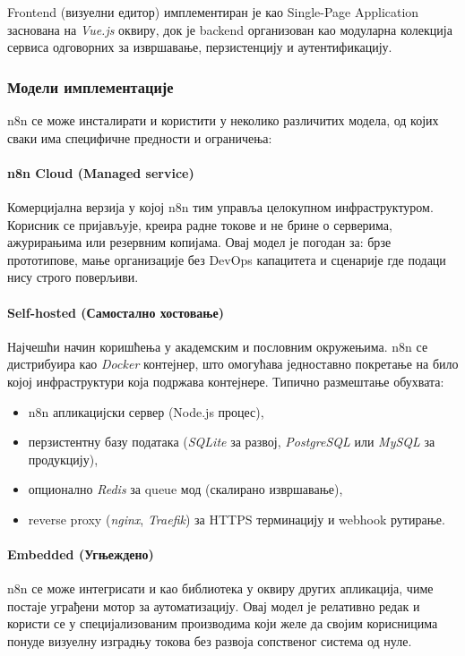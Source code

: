 Frontend (визуелни едитор) имплементиран је као Single-Page Application
заснована на \textit{Vue.js} оквиру, док је backend организован као
модуларна колекција сервиса одговорних за извршавање, перзистенцију
и аутентификацију.

\subsubsection{Модели имплементације}

n8n се може инсталирати и користити у неколико различитих модела,
од којих сваки има специфичне предности и ограничења:

\paragraph{n8n Cloud (Managed service)}
Комерцијална верзија у којој n8n тим управља целокупном инфраструктуром.
Корисник се пријављује, креира радне токове и не брине о серверима,
ажурирањима или резервним копијама. Овај модел је погодан за:
брзе прототипове, мање организације без DevOps капацитета и сценарије
где подаци нису строго поверљиви.

\paragraph{Self-hosted (Самостално хостовање)}
Најчешћи начин коришћења у академским и пословним окружењима.
n8n се дистрибуира као \textit{Docker} контејнер, што омогућава
једноставно покретање на било којој инфраструктури која подржава
контејнере. Типично размештање обухвата:

\begin{itemize}
    \item n8n апликацијски сервер (Node.js процес),
    \item перзистентну базу података (\textit{SQLite} за развој,
    \textit{PostgreSQL} или \textit{MySQL} за продукцију),
    \item опционално \textit{Redis} за queue мод (скалирано извршавање),
    \item reverse proxy (\textit{nginx}, \textit{Traefik}) за HTTPS
    терминацију и webhook рутирање.
\end{itemize}

\paragraph{Embedded (Угњеждено)}
n8n се може интегрисати и као библиотека у оквиру других апликација,
чиме постаје уграђени мотор за аутоматизацију. Овај модел је релативно
редак и користи се у специјализованим производима који желе да својим
корисницима понуде визуелну изградњу токова без развоја сопственог
система од нуле.

